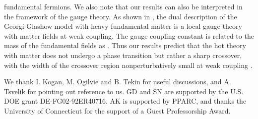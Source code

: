 \documentclass[a4paper,aps,prd,superscriptaddress,showpacs,showkeys]{revtex4}
\begin{document}
fundamental fermions. We also note that our results can also be
interpreted
in the framework of the \coordHE{} gauge theory. As shown  in \cite{fosco},
the
dual description of the Georgi-Glashow model with heavy fundamental
matter
is a local \coordHE{} gauge theory with matter fields  at weak coupling. The
\coordHE{} gauge  coupling constant  is related to the mass of the fundamental
fields as \coordHE{}. Thus our results predict that the hot
\coordHE{}
theory with matter does not undergo a phase transition but rather a sharp
crossover, with the width of the crossover region nonperturbatively small
at weak coupling
\coordHE{}.

\begin{acknowledgments}
We thank I. Kogan, M. Ogilvie and B. Tekin for useful discussions,
and A. Tsvelik for pointing out reference \cite{zamolodchikov} to us.
GD and SN are supported  by the U.S. DOE grant DE-FG02-92ER40716.
AK is supported by PPARC, and thanks the University of Connecticut for
the
support of a Guest Professorship Award.
\end{acknowledgments}
\end{document}
